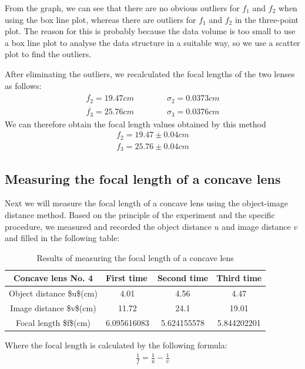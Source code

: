\documentclass[UTF8]{article}
\begin{document}
        From the graph, we can see that there are no obvious outliers for $f_1$ and $f_2$ when using the box line plot, whereas there are outliers for $f_1$ and $f_2$ in the three-point plot. The reason for this is probably because the data volume is too small to use a box line plot to analyse the data structure in a suitable way, so we use a scatter plot to find the outliers.
        
        After eliminating the outliers, we recalculated the focal lengths of the two lenses as follows:
        \begin{align*}
             \overline{f_2}  =  19.47cm \qquad \qquad \sigma _2  = 0.0373cm\\
             \overline{f_3}  =  25.76cm \qquad \qquad \sigma _3  = 0.0376cm
            \end{align*}
            We can therefore obtain the focal length values obtained by this method
            \begin{align*}
            f_2 = 19.47\pm 0.04cm\\
            f_3 = 25.76  \pm 0.04cm
            \end{align*}
        



    \subsection{Measuring the focal length of a concave lens}
    Next we will measure the focal length of a concave lens using the object-image distance method. Based on the principle of the experiment and the specific procedure, we measured and recorded the object distance $u$ and image distance $v$ and filled in the following table:
    \begin{table}[H]
      \centering
      \caption{Results of measuring the focal length of a concave lens}
        \begin{tabular}{cccc}
        \toprule[2pt]
        Concave lens No. 4 & \multicolumn{1}{l}{First time} & \multicolumn{1}{l}{Second time} & \multicolumn{1}{l}{Third time} \\
         \midrule
        Object distance \$u\$(cm) & 4.01  & 4.56  & 4.47 \\
        Image distance \$v\$(cm) & 11.72 & 24.1  & 19.01 \\
        Focal length \$f\$(cm) & 6.095616083 & 5.624155578 & 5.844202201 \\
         \bottomrule[2pt]
        \end{tabular}%
      \label{tab:addlabel}%
    \end{table}%
    Where the focal length is calculated by the following formula:
       \begin{eqnarray}
           \frac{1}{f}  = \frac{1}{u}-\frac{1}{\upsilon }   
           \end{eqnarray}
           
\end{document}
